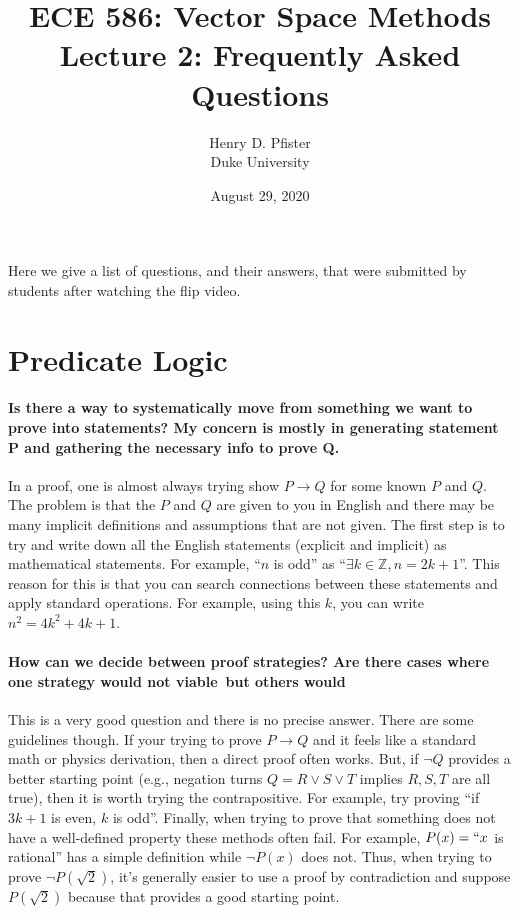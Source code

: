 \documentclass[10pt,english]{article}
\begin{document}
\title{ECE 586: Vector Space Methods \\ Lecture 2: Frequently Asked Questions}
\author{Henry D. Pfister \\ Duke University}
\date{August 29, 2020}

\maketitle

Here we give a list of questions, and their answers, that were submitted by students after watching the flip video.

\section{Predicate Logic}

\paragraph{Is there a way to systematically move from something we want to prove into statements? My concern is mostly in generating statement P and gathering the necessary info to prove Q.}

In a proof, one is almost always trying show $P \rightarrow Q$ for some known $P$ and $Q$.  The problem is that the $P$ and $Q$ are given to you in English and there may be many implicit definitions and assumptions that are not given.  The first step is to try and write down all the English statements (explicit and implicit) as mathematical statements.  For example, ``$n$ is odd'' as ``$\exists k \in \mathbb{Z}, n = 2k+1$''.  This reason for this is that you can search connections between these statements and apply standard operations.  For example, using this $k$, you can write $n^2 = 4k^2 + 4k + 1$.
   
\paragraph{How can we decide between proof strategies? Are there cases where one strategy would not viable but others would}

This is a very good question and there is no precise answer.  There are some guidelines though.  If your trying to prove $P \to Q$ and it feels like a standard math or physics derivation, then a direct proof often works.  But, if $\neg Q$ provides a better starting point (e.g., negation turns $Q = R \vee S \vee T$ implies $R,S,T$ are all true), then it is worth trying the contrapositive.  For example, try proving ``if $3k+1$ is even, $k$ is odd''.  Finally, when trying to prove that something does not have a well-defined property these methods often fail.  For example, $P(x)=``x$ is rational'' has a simple definition while $\neg P(x)$ does not.  Thus, when trying to prove $\neg P(\sqrt{2})$, it's generally easier to use a proof by contradiction and suppose $P(\sqrt{2})$ because that provides a good starting point.
\end{document}
